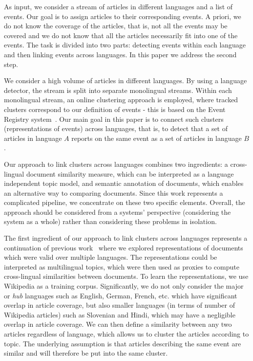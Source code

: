 \documentclass[twoside,11pt]{article}
\begin{document}
As input, we consider a stream of articles in different languages and a list of events. Our goal is to assign articles to their corresponding events. A priori, we do not know the coverage of the articles, that is, not all the events may be covered and we do not know that all the articles necessarily fit into one of the events. The task is divided into two parts: detecting events within each language and then linking events across languages. In this paper we address the second step.

 We consider a high volume of articles in different languages. By using a language detector, the stream is split into separate monolingual streams. Within each monolingual stream, an online clustering approach is employed, where tracked clusters correspond to our definition of events - this is based on the Event Registry system~. Our main goal in this paper is to connect such clusters (representations of events) across languages, that is, to detect that a set of articles in language $A$ reports on the same event as a set of articles in language $B$.

Our approach to link clusters across languages combines two ingredients: a cross-lingual document similarity measure, which can be interpreted as a language independent topic model, and semantic annotation of documents, which enables an alternative way to comparing documents. Since this work represents a complicated pipeline, we concentrate on these two specific elements. Overall, the approach should be considered from a systems' perspective (considering the system as a whole) rather than considering these problems in isolation.

The first ingredient of our approach to link clusters across languages represents a continuation of previous work~ where we explored representations of documents which were valid over multiple languages.  The representations could be interpreted as multilingual topics, which were then used as proxies to compute cross-lingual similarities between documents. To learn the representations, we use Wikipedia as a training corpus. Significantly, we do not only consider the major or \emph{hub} languages such as English, German, French, etc. which have significant overlap in article coverage, but also smaller languages (in terms of number of Wikipedia articles) such as Slovenian and Hindi, which may have a negligible overlap in article coverage. We can then define a similarity between any two articles regardless of language,  which allows us to cluster the articles according to topic. The underlying assumption is that articles describing the same event are similar  and will therefore be put into the same cluster.
\end{document}
